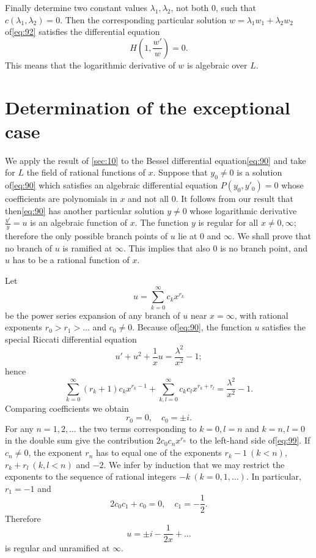 Finally determine two constant values $\lambda_1, \lambda_2$, not both 0, such that $c(\lambda_1, \lambda_2)=0$. Then the corresponding particular solution $w=\lambda_1 w_1 + \lambda_2 w_2$ of\eqref{eq:92} satisfies the differential equation
\[H\left(1,\frac{w'}{w}\right) = 0.\]
This means that the logarithmic derivative of $w$ is algebraic over $L$.

\section{Determination of the exceptional case}\label{sec:11}

We apply the result of \autoref{sec:10} to the Bessel differential equation\eqref{eq:90} and take for $L$ the field of rational functions of $x$. Suppose that $y_0 \neq 0$ is a solution of\eqref{eq:90} which satisfies an algebraic differential equation $P(y_0,y'_0)=0$ whose coefficients are polynomials in $x$ and not all 0. It follows from our result that then\eqref{eq:90} has another particular solution $y \neq 0$ whose logarithmic derivative $\frac{y'}{y} = u$ is an algebraic function of $x$. The function $y$ is regular for all $x \neq 0, \infty$; therefore the only possible branch points of $u$ lie at $0$ and $\infty$. We shall prove that no branch of $u$ is ramified at $\infty$. This implies that also $0$ is no branch point, and $u$ has to be a rational function of $x$.

Let
\begin{equation}
u = \sum_{k=0}^{\infty} c_k x^{r_k} \tag{98}\label{eq:98}
\end{equation}
be the power series expansion of any branch of $u$ near $x=\infty$, with rational exponents $r_0 > r_1 > \dots$ and $c_0 \neq 0$. Because of\eqref{eq:90}, the function $u$ satisfies the special Riccati differential equation
\[u' + u^2 + \frac{1}{x}u = \frac{\lambda^2}{x^2} - 1;\]
hence
\begin{equation}
\sum_{k=0}^{\infty} (r_k+1)c_k x^{r_k-1} + \sum_{k,l=0}^{\infty} c_k c_l x^{r_k+r_l} = \frac{\lambda^2}{x^2} - 1. \tag{99}\label{eq:99}
\end{equation}
Comparing coefficients we obtain
\[r_0 = 0, \quad c_0 = \pm i.\]
For any $n=1,2,\dots$ the two terms corresponding to $k=0, l=n$ and $k=n, l=0$ in the double sum give the contribution $2 c_0 c_n x^{r_n}$ to the left-hand side of\eqref{eq:99}. If $c_n \neq 0$, the exponent $r_n$ has to equal one of the exponents $r_k-1 \ (k < n)$, $r_k+r_l \ (k, l < n)$ and $-2$. We infer by induction that we may restrict the exponents to the sequence of rational integers $-k \ (k=0,1,\dots)$. In particular, $r_1 = -1$ and
\[2c_0c_1 + c_0 = 0, \quad c_1 = -\frac{1}{2}.\]
Therefore
\begin{equation}
u = \pm i - \frac{1}{2x} + \dots \tag{100}\label{eq:100}
\end{equation}
is regular and unramified at $\infty$.

